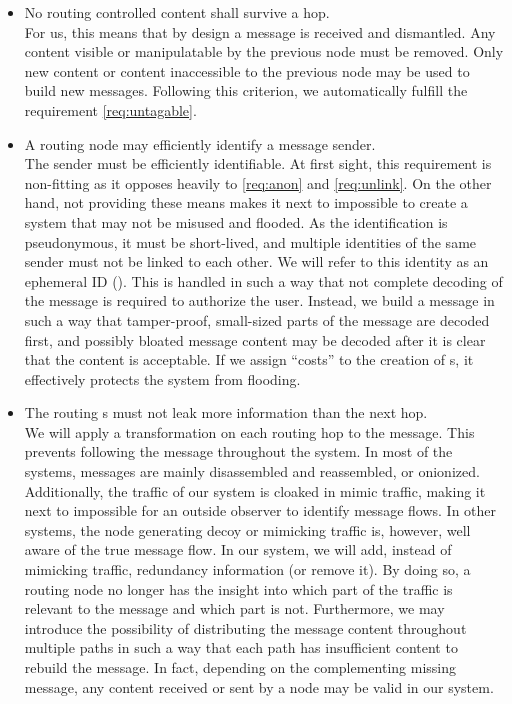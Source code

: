 \begin{itemize}
	\item No routing controlled content shall survive a hop.\\
	For us, this means that by design a message is received and dismantled. Any content visible or manipulatable by the previous node must be removed. Only new content or content inaccessible to the previous node may be used to build new messages. Following this criterion, we automatically fulfill the requirement \ref{req:untagable}.
	\item A routing node may efficiently identify a message sender.\\      
	The sender must be efficiently identifiable. At first sight, this requirement is non-fitting as it opposes heavily to \ref{req:anon} and \ref{req:unlink}. On the other hand, not providing these means makes it next to impossible to create a system that may not be misused and flooded. As the identification is pseudonymous, it must be short-lived, and multiple identities of the same sender must not be linked to each other. We will refer to this identity as an ephemeral ID (). This  is handled in such a way that not complete decoding of the message is required to authorize the user. Instead, we build a message in such a way that tamper-proof, small-sized parts of the message are decoded first, and possibly bloated message content may be decoded after it is clear that the content is acceptable. If we assign ``costs'' to the creation of s, it effectively protects the system from flooding.
	\item The routing s must not leak more information than the next hop.\\
	We will apply a transformation on each routing hop to the message. This prevents following the message throughout the system. In most of the systems, messages are mainly disassembled and reassembled, or onionized. Additionally, the traffic of our system is cloaked in mimic traffic, making it next to impossible for an outside observer to identify message flows. In other systems, the node generating decoy or mimicking traffic is, however, well aware of the true message flow. In our system, we will add, instead of mimicking traffic, redundancy information (or remove it). By doing so, a routing node no longer has the insight into which part of the traffic is relevant to the message and which part is not. Furthermore, we may introduce the possibility of distributing the message content throughout multiple paths in such a way that each path has insufficient content to rebuild the message. In fact, depending on the complementing missing message, any content received or sent by a node may be valid in our system. 

\end{itemize}
